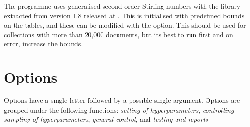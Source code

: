 \documentclass[a4paper,english]{article}
\begin{document}
The programme uses generalised second order Stirling numbers
with the library extracted from  version 1.8
released at .
This is initialised with predefined bounds on the tables,
and these can be modified with the  option.
This should be used for collections with more than
20,000 documents, but its best to run first and on
error, increase the bounds.


\section{Options}

Options have a single letter followed by a possible
single argument. Options are grouped under
the following functions:
\emph{setting of hyperparameters}, 
\emph{controlling sampling of hyperparameters},
\emph{general control}, and
\emph{testing and reports}
\end{document}
